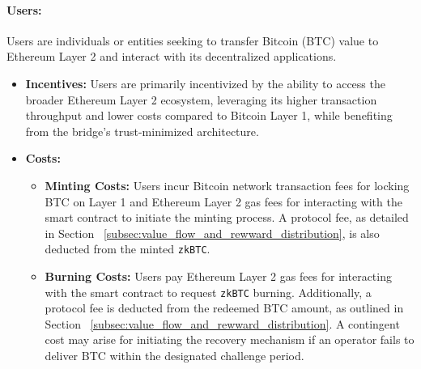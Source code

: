 \documentclass{DESSThesis}
\newcommand{\zktoken}{\texttt{zkBTC}}
\begin{document}
\paragraph{Users:}
Users are individuals or entities seeking to transfer Bitcoin (BTC) value to Ethereum Layer 2 and interact with its decentralized applications.
\begin{itemize}
    \item \textbf{Incentives:} Users are primarily incentivized by the ability to access the broader Ethereum Layer 2 ecosystem, leveraging its higher transaction throughput and lower costs compared to Bitcoin Layer 1, while benefiting from the bridge's trust-minimized architecture.
    \item \textbf{Costs:}
        \begin{itemize}
            \item \textbf{Minting Costs:} Users incur Bitcoin network transaction fees for locking BTC on Layer 1 and Ethereum Layer 2 gas fees for interacting with the smart contract to initiate the minting process. A protocol fee, as detailed in Section ~\ref{subsec:value_flow_and_rewward_distribution}, is also deducted from the minted \texttt{\zktoken}.
            \item \textbf{Burning Costs:} Users pay Ethereum Layer 2 gas fees for interacting with the smart contract to request \texttt{\zktoken} burning. Additionally, a protocol fee is deducted from the redeemed BTC amount, as outlined in Section ~\ref{subsec:value_flow_and_rewward_distribution}. A contingent cost may arise for initiating the recovery mechanism if an operator fails to deliver BTC within the designated challenge period.
        \end{itemize}
\end{itemize}   
    
\end{document}
